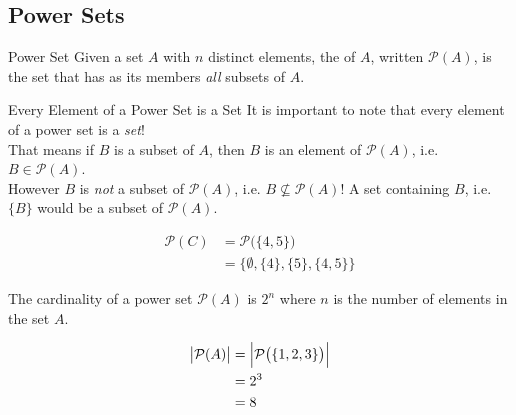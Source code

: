 \documentclass[../notes.tex]{subfiles}
\begin{document}
			\subsection{Power Sets}
				\begin{definition}{Power Set}
					Given a set $A$ with $n$ distinct elements, the  of $A$, written $\mathcal{P}(A)$, is the set that has as its members \emph{all} subsets of $A$.
				\end{definition}
				\nopagebreak
				\begin{sidenote}{Every Element of a Power Set is a Set}
					It is important to note that every element of a power set is a \emph{set}!\\ That means if $B$ is a subset of $A$, then $B$ is an element of $\mathcal{P}(A)$, i.e. $B \in \mathcal{P}(A)$.\\
					However $B$ is \emph{not} a subset of $\mathcal{P}(A)$, i.e. $B \nsubseteq \mathcal{P}(A)$! A set containing $B$, i.e. $\{B\}$ would be a subset of $\mathcal{P}(A)$.
				\end{sidenote}
				\nopagebreak
				\begin{example} \moveup
					\begin{align*}
						\mathcal{P}(C) &= \mathcal{P}\bigl(\{4, 5\}\bigr)\\
						&= \bigl\{\emptyset, \{4\}, \{5\}, \{4, 5\}\bigr\}
					\end{align*}
				\end{example}
				The cardinality of a power set $\mathcal{P}(A)$ is $2^{n}$ where $n$ is the number of elements in the set $A$.
				\begin{example} \moveup
					\begin{align*}
						\bigl\lvert \mathcal{P}(A)\bigr\rvert &= \Bigl\lvert\mathcal{P}\bigl(\{1, 2, 3\}\bigr)\Bigr\rvert\\
						&= 2^{3}\\
						&= 8
					\end{align*}
				\end{example}
			\pagebreak
\end{document}
